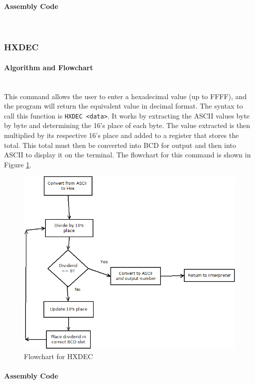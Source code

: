 \documentclass[12pt]{article}
\begin{document}
			\paragraph{Assembly Code}~\\
			
			\subsubsection{HXDEC}
			\paragraph{Algorithm and Flowchart}~\\
			This command allows the user to enter a hexadecimal value (up to FFFF), and the program will return the equivalent value in decimal format. The syntax to call this function is \texttt{HXDEC <data>}. It works by extracting the ASCII values byte by byte and determining the 16's place of each byte. The value extracted is then multiplied by its respective 16's place and added to a register that stores the total. This total must then be converted into BCD for output and then into ASCII to display it on the terminal. The flowchart for this command is shown in Figure \ref{fig:HXDEC}.
			
			
\begin{figure}[H]
\centering
\includegraphics[width=0.7\linewidth]{HXDEC}
\caption{Flowchart for HXDEC}
\label{fig:HXDEC}
\end{figure}
			\paragraph{Assembly Code}~\\
			
\end{document}
